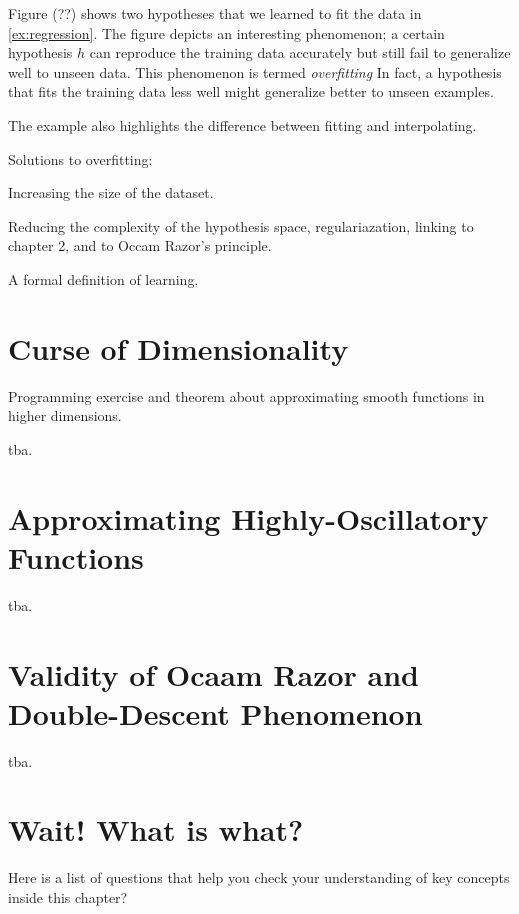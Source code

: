 Figure (??) shows two hypotheses that we learned to fit the data in
\autoref{ex:regression}. The figure depicts an interesting phenomenon; a certain
hypothesis $h$ can reproduce the training data accurately but still fail to
generalize well to unseen data. This phenomenon is termed \emph{overfitting} In fact, a hypothesis that fits the training
data less well might generalize better to unseen examples. 

The example also highlights the difference between fitting and interpolating. 

Solutions to overfitting:

Increasing the size of the dataset. 

Reducing the complexity of the hypothesis space, regulariazation,  linking to
chapter 2, and to Occam Razor's principle. 

A formal definition of learning.

\section{Curse of Dimensionality}
Programming exercise and theorem about approximating smooth functions in higher
dimensions. 
\begin{boxedexample}[Classification] \complementary{\theexample}
    \label{ex:CoD}
tba.
\end{boxedexample}

\section{Approximating Highly-Oscillatory Functions}
\begin{boxedexample}[Classification] \complementary{\theexample}
    \label{ex:oscillatory}
    tba.
\end{boxedexample}

\section{Validity of Ocaam Razor and Double-Descent Phenomenon}
\begin{boxedexample} \complementary{\theexample}
    \label{ex:double_descent}
    tba.
\end{boxedexample}

\section*{Wait! What is what?}
Here is a list of questions that help you check your understanding of key
concepts inside this chapter?

